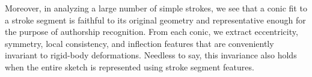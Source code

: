Moreover, in analyzing a large number of simple strokes, we see that a conic fit to a stroke segment is faithful to its original geometry and representative enough for the purpose of authorship recognition. From each conic, we extract eccentricity, symmetry, local consistency, and inflection features that are conveniently invariant to rigid-body deformations. Needless to say, this invariance also holds when the entire sketch is represented using stroke segment features. %



